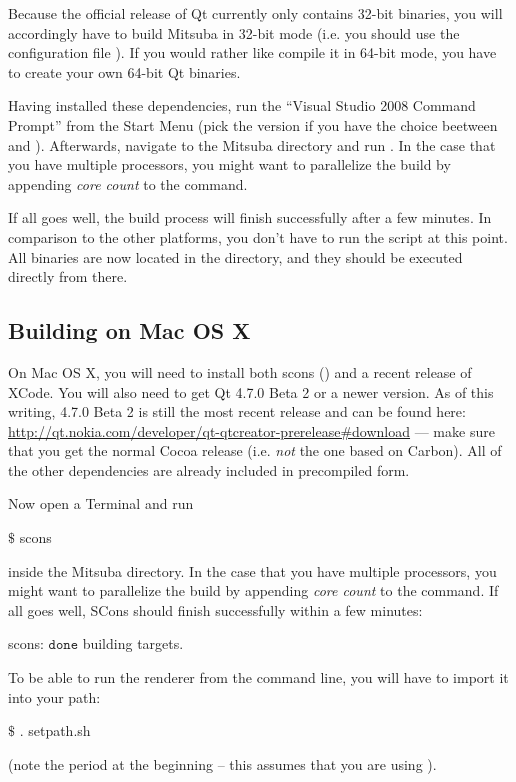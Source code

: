 Because the official release of Qt currently only contains 32-bit binaries, you will accordingly have to 
build Mitsuba in 32-bit mode (i.e. you should use the configuration file ). If you would rather like compile it in 64-bit mode, you have to create
your own 64-bit Qt binaries.

Having installed these dependencies, run the ``Visual Studio 2008 Command 
Prompt'' from the Start Menu (pick the  version if you have the choice beetween  and ). Afterwards,
navigate to the Mitsuba directory and run . 
In the case that you have multiple processors, you might want to parallelize the build by appending \emph{core count} to the  command.

If all goes well, the build process will finish successfully after a few
minutes. In comparison to the other platforms, you don't have to run the  script at this point. 
All binaries are now located in the  directory, and they should be executed directly from there.

\subsection{Building on Mac OS X}
On Mac OS X, you will need to install both scons () and 
a recent release of XCode. You will also need to get Qt 4.7.0 Beta 2 or a newer version.
As of this writing, 4.7.0 Beta 2 is still the most recent release and can be found here: \url{http://qt.nokia.com/developer/qt-qtcreator-prerelease#download}
--- make sure that you get the normal Cocoa release (i.e. \emph{not} the one based on Carbon). All of the
other dependencies are already included in precompiled form.

Now open a Terminal and run
\begin{shell}
$\text{\$}$ scons
\end{shell}
inside the Mitsuba directory. In the case that you have multiple processors, you might want to parallelize the build by appending \emph{core count} to the command.
If all goes well, SCons should finish successfully within a few minutes:
\begin{shell}
scons: $\texttt{done}$ building targets.
\end{shell}
To be able to run the renderer from the command line, you will have to import it into your path:
\begin{shell}
$\text{\$}$ . setpath.sh
\end{shell}
(note the period at the beginning -- this assumes that you are using ).
